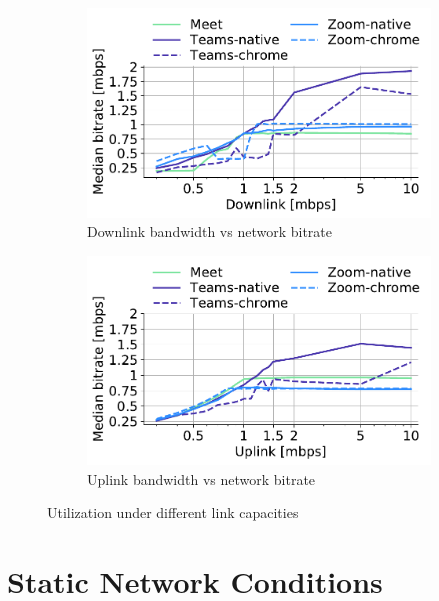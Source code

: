 \begin{figure}[]
\vspace{-7em}
\begin{subfigure}[t]{0.45\textwidth}
\centering
    \includegraphics[width=\textwidth,keepaspectratio]{figures/static/downlink.pdf}
    \caption{Downlink bandwidth vs network bitrate}
	\label{subfig:downlink_bitrate}
\end{subfigure} 
\begin{subfigure}[t]{0.45\textwidth}
    \centering
    \includegraphics[width=\textwidth,keepaspectratio]{figures/static/uplink.pdf}
    \caption{Uplink bandwidth vs network bitrate}
	\label{subfig:uplink_bitrate}
\end{subfigure}
\caption{Utilization under different link capacities}
\label{fig:static}
\end{figure}

\section{Static Network Conditions}\label{sec:static}

